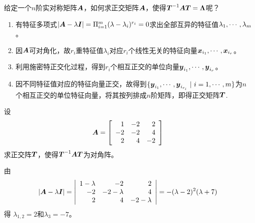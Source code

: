 \begin{frame}
  给定一个$n$阶实对称矩阵$\boldsymbol{A}$，如何求正交矩阵$\boldsymbol{A}$，使得$\boldsymbol{T}^{-1}\boldsymbol{A}\boldsymbol{T}=\boldsymbol{\Lambda}$呢？
  \vspace{.1in}\pause

  \begin{enumerate}
  \item 有特征多项式$|\boldsymbol{A}-\lambda\boldsymbol{I}|=\Pi_{i=1}^m(\lambda-\lambda_i)^{r_i}=0$求出全部互异的特征值$\lambda_1,\cdots,\lambda_m$。\\[.1in]
  \item 因$\boldsymbol{A}$可对角化，故$r_i$重特征值$\lambda_i$对应$r_i$个线性无关的特征向量${\boldsymbol{x}}_{i_1},\cdots,{\boldsymbol{x}}_{i_r}$。\\[.1in]
  \item 利用施密特正交化过程，得到$r_i$个相互正交的单位向量${\boldsymbol{y}}_{i_1},\cdots,{\boldsymbol{y}}_{i_r}$。\\[.1in]
  \item 因不同特征值对应的特征向量正交，故得到$\{{\boldsymbol{y}}_{i_1},\cdots,{\boldsymbol{y}}_{i_{r_i}} ~|~ i=1,\cdots,m \}$为$n$个相互正交的单位特征向量，将其按列排成$n$阶矩阵，即得正交矩阵$\boldsymbol{T}$.
  \end{enumerate}
\end{frame}

\begin{frame}
  \begin{li}
    设$$
    \boldsymbol{A}=\left[
      \begin{array}{rrr}
        1&-2&2\\
        -2&-2&4\\
        2&4&-2
      \end{array}
    \right]
    $$
    求正交阵$\boldsymbol{T}$，使得$\boldsymbol{T}^{-1}\boldsymbol{A}\boldsymbol{T}$为对角阵。
  \end{li}
  \pause 
  \begin{jie}
    由
    $$
    |\boldsymbol{A}-\lambda\boldsymbol{I}|=\left|
      \begin{array}{rrr}
        1-\lambda&-2&2\\
        -2&-2-\lambda&4\\
        2&4&-2-\lambda
      \end{array}
    \right|=-(\lambda-2)^2(\lambda+7)
    $$得
    $\lambda_{1,2}=2$和$\lambda_3=-7$。 \pause 
  \end{jie}
\end{frame}

